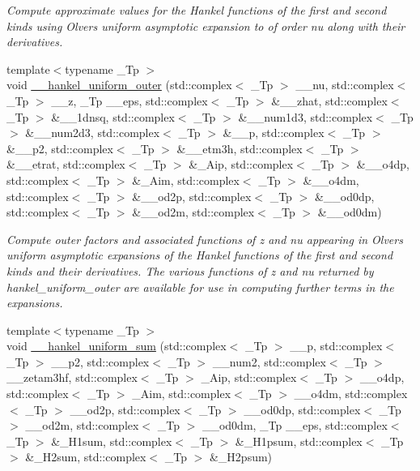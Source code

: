 \begin{DoxyCompactItemize}
\begin{DoxyCompactList}\small\item\em Compute approximate values for the Hankel functions of the first and second kinds using Olver\textquotesingle{}s uniform asymptotic expansion to of order {\ttfamily nu} along with their derivatives. \end{DoxyCompactList}\item 
{\footnotesize template$<$typename \+\_\+\+Tp $>$ }\\void \hyperlink{namespacestd_1_1____detail_a099751f2a153283d91f19d6efa52117a}{\+\_\+\+\_\+hankel\+\_\+uniform\+\_\+outer} (std\+::complex$<$ \+\_\+\+Tp $>$ \+\_\+\+\_\+nu, std\+::complex$<$ \+\_\+\+Tp $>$ \+\_\+\+\_\+z, \+\_\+\+Tp \+\_\+\+\_\+eps, std\+::complex$<$ \+\_\+\+Tp $>$ \&\+\_\+\+\_\+zhat, std\+::complex$<$ \+\_\+\+Tp $>$ \&\+\_\+\+\_\+1dnsq, std\+::complex$<$ \+\_\+\+Tp $>$ \&\+\_\+\+\_\+num1d3, std\+::complex$<$ \+\_\+\+Tp $>$ \&\+\_\+\+\_\+num2d3, std\+::complex$<$ \+\_\+\+Tp $>$ \&\+\_\+\+\_\+p, std\+::complex$<$ \+\_\+\+Tp $>$ \&\+\_\+\+\_\+p2, std\+::complex$<$ \+\_\+\+Tp $>$ \&\+\_\+\+\_\+etm3h, std\+::complex$<$ \+\_\+\+Tp $>$ \&\+\_\+\+\_\+etrat, std\+::complex$<$ \+\_\+\+Tp $>$ \&\+\_\+\+Aip, std\+::complex$<$ \+\_\+\+Tp $>$ \&\+\_\+\+\_\+o4dp, std\+::complex$<$ \+\_\+\+Tp $>$ \&\+\_\+\+Aim, std\+::complex$<$ \+\_\+\+Tp $>$ \&\+\_\+\+\_\+o4dm, std\+::complex$<$ \+\_\+\+Tp $>$ \&\+\_\+\+\_\+od2p, std\+::complex$<$ \+\_\+\+Tp $>$ \&\+\_\+\+\_\+od0dp, std\+::complex$<$ \+\_\+\+Tp $>$ \&\+\_\+\+\_\+od2m, std\+::complex$<$ \+\_\+\+Tp $>$ \&\+\_\+\+\_\+od0dm)
\begin{DoxyCompactList}\small\item\em Compute outer factors and associated functions of {\ttfamily z} and {\ttfamily nu} appearing in Olver\textquotesingle{}s uniform asymptotic expansions of the Hankel functions of the first and second kinds and their derivatives. The various functions of z and nu returned by {\ttfamily hankel\+\_\+uniform\+\_\+outer} are available for use in computing further terms in the expansions. \end{DoxyCompactList}\item 
{\footnotesize template$<$typename \+\_\+\+Tp $>$ }\\void \hyperlink{namespacestd_1_1____detail_a561dc02bc44b2dba376d6047289563c7}{\+\_\+\+\_\+hankel\+\_\+uniform\+\_\+sum} (std\+::complex$<$ \+\_\+\+Tp $>$ \+\_\+\+\_\+p, std\+::complex$<$ \+\_\+\+Tp $>$ \+\_\+\+\_\+p2, std\+::complex$<$ \+\_\+\+Tp $>$ \+\_\+\+\_\+num2, std\+::complex$<$ \+\_\+\+Tp $>$ \+\_\+\+\_\+zetam3hf, std\+::complex$<$ \+\_\+\+Tp $>$ \+\_\+\+Aip, std\+::complex$<$ \+\_\+\+Tp $>$ \+\_\+\+\_\+o4dp, std\+::complex$<$ \+\_\+\+Tp $>$ \+\_\+\+Aim, std\+::complex$<$ \+\_\+\+Tp $>$ \+\_\+\+\_\+o4dm, std\+::complex$<$ \+\_\+\+Tp $>$ \+\_\+\+\_\+od2p, std\+::complex$<$ \+\_\+\+Tp $>$ \+\_\+\+\_\+od0dp, std\+::complex$<$ \+\_\+\+Tp $>$ \+\_\+\+\_\+od2m, std\+::complex$<$ \+\_\+\+Tp $>$ \+\_\+\+\_\+od0dm, \+\_\+\+Tp \+\_\+\+\_\+eps, std\+::complex$<$ \+\_\+\+Tp $>$ \&\+\_\+\+H1sum, std\+::complex$<$ \+\_\+\+Tp $>$ \&\+\_\+\+H1psum, std\+::complex$<$ \+\_\+\+Tp $>$ \&\+\_\+\+H2sum, std\+::complex$<$ \+\_\+\+Tp $>$ \&\+\_\+\+H2psum)

\end{DoxyCompactItemize}
